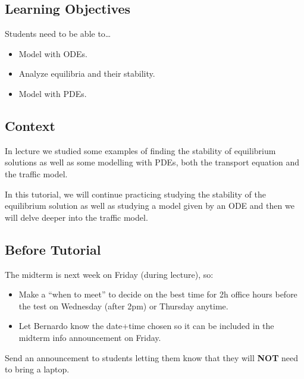 \subsection*{Learning Objectives}
	Students need to be able to\ldots
		\begin{itemize}\it 
			\item Model with ODEs. \\[-20pt]
			\item Analyze equilibria and their stability. \\[-20pt]
			\item Model with PDEs.
		\end{itemize}


%	
\subsection*{Context}
	
In lecture we studied some examples of finding the stability of equilibrium solutions as well as some modelling with PDEs, both the transport equation and the traffic model.

In this tutorial, we will continue practicing studying the stability of the equilibrium solution as well as studying a model given by an ODE and then we will delve deeper into the traffic model.




\subsection*{Before Tutorial}


The midterm is next week on Friday (during lecture), so:
\begin{itemize}
	\item Make a ``when to meet'' to decide on the best time for 2h office hours before the test on Wednesday (after 2pm) or Thursday anytime.
	\item Let Bernardo know the date+time chosen so it can be included in the midterm info announcement on Friday.
\end{itemize}


Send an announcement to students letting them know that they will \textbf{NOT} need to bring a laptop. %

